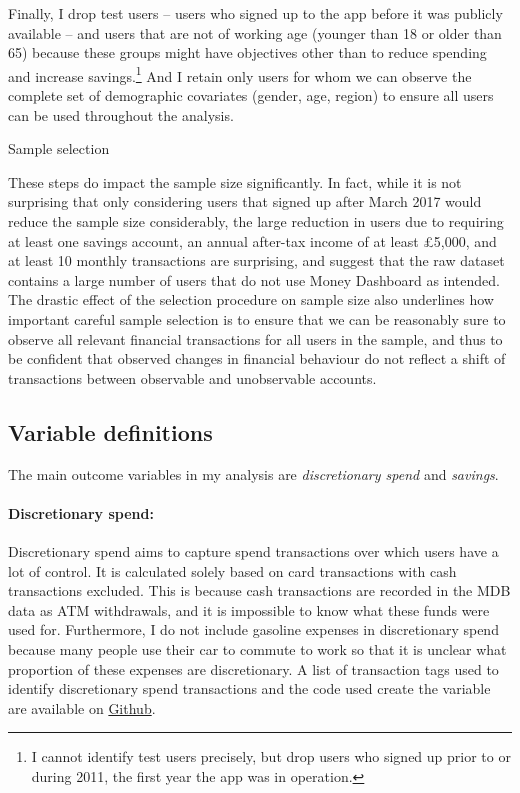 Finally, I drop test users -- users who signed up to the app before it was
publicly available -- and users that are not of working age (younger than
18 or older than 65) because these groups might have objectives other than to
reduce spending and increase savings.\footnote{I cannot identify test users
    precisely, but drop users who signed up prior to or during 2011, the first
year the app was in operation.} And I retain only users for whom we can observe
the complete set of demographic covariates (gender, age, region) to ensure all
users can be used throughout the analysis. 

\begin{table}
\centering\footnotesize
\caption{Sample selection}\label{tab:selection}

\end{table}

These steps do impact the sample size significantly. In fact, while it is not
surprising that only considering users that signed up after March 2017 would
reduce the sample size considerably, the large reduction in users due to
requiring at least one savings account, an annual after-tax income of at least
\pounds5,000, and at least 10 monthly transactions are surprising, and suggest
that the raw dataset contains a large number of users that do not use Money
Dashboard as intended. The drastic effect of the selection procedure on sample
size also underlines how important careful sample selection is to ensure that
we can be reasonably sure to observe all relevant financial transactions for
all users in the sample, and thus to be confident that observed changes in
financial behaviour do not reflect a shift of transactions between observable
and unobservable accounts.


\subsection{Variable definitions}%

The main outcome variables in my analysis are \textit{discretionary spend} and
\textit{savings}.

\paragraph{Discretionary spend:} Discretionary spend aims to capture spend
transactions over which users have a lot of control. It is calculated solely
based on card transactions with cash transactions excluded. This is because
cash transactions are recorded in the MDB data as ATM withdrawals, and it is
impossible to know what these funds were used for. Furthermore, I do not
include gasoline expenses in discretionary spend because many people use their
car to commute to work so that it is unclear what proportion of these expenses
are discretionary. A list of transaction tags used to identify discretionary
spend transactions and the code used create the variable are available on
\href{https://github.com/fabiangunzinger/mdb_eval/blob/f31bfcd7a330188cdd27968d41957ebf5b454099/src/data/aggregators.py\#L389}{Github}.


